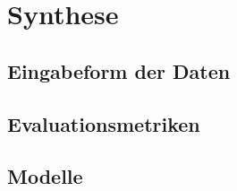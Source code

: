 \chapter{Synthese}

\section{Eingabeform der Daten}

\section{Evaluationsmetriken}

\section{Modelle}
